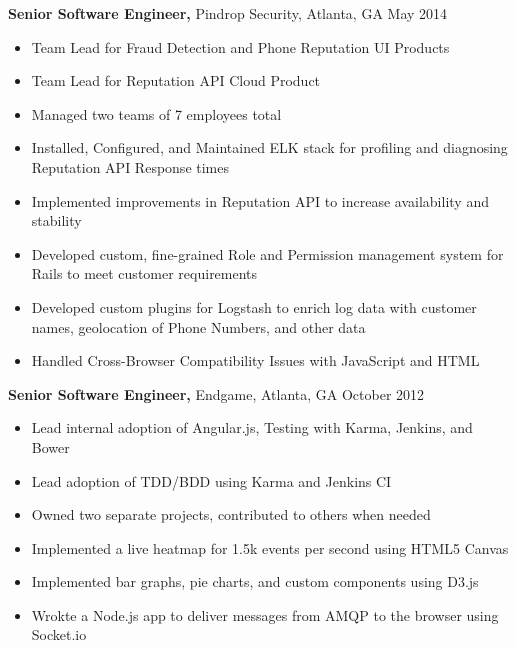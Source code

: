\documentclass[margin]{res}
\begin{document}
\begin{resume}
    {\bf Senior Software Engineer,} Pindrop Security, Atlanta, GA \hfill May 2014
        \begin{itemize} \itemsep -2pt %
            \item Team Lead for Fraud Detection and Phone Reputation UI Products
            \item Team Lead for Reputation API Cloud Product
            \item Managed two teams of 7 employees total
            \item Installed, Configured, and Maintained ELK stack for profiling
                and diagnosing Reputation API Response times
            \item Implemented improvements in Reputation API to increase
                availability and stability
            \item Developed custom, fine-grained Role and Permission management
                system for Rails to meet customer requirements
            \item Developed custom plugins for Logstash to enrich log data with
                customer names, geolocation of Phone Numbers, and other data
            \item Handled Cross-Browser Compatibility Issues with JavaScript
                and HTML
        \end{itemize}

    {\bf Senior Software Engineer,} Endgame, Atlanta, GA \hfill October 2012
        \begin{itemize} \itemsep -2pt %
            \item Lead internal adoption of Angular.js, Testing with Karma,
                Jenkins, and Bower
            \item Lead adoption of TDD/BDD using Karma and Jenkins CI
            \item Owned two separate projects, contributed to others when
                needed
            \item Implemented a live heatmap for 1.5k events per second using HTML5 Canvas
            \item Implemented bar graphs, pie charts, and custom components using D3.js
            \item Wrokte a Node.js app to deliver messages from AMQP to the browser using
                Socket.io
        \end{itemize}


\end{resume}
\end{document}
